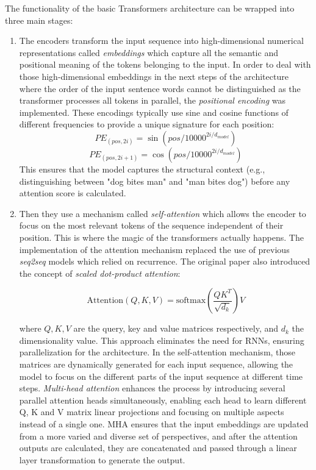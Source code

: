 
The functionality of the basic Transformers architecture can be wrapped into three main stages: 

\begin{enumerate}
	\item The encoders transform the input sequence into high-dimensional numerical representations called \textit{embeddings} which capture all the semantic and positional meaning of the tokens belonging to the input. In order to deal with those high-dimensional embeddings in the next steps of the architecture where the order of the input sentence words cannot be distinguished as the transformer processes all tokens in parallel, the \textit{positional encoding} was implemented. These encodings typically use sine and cosine functions of different frequencies to provide a unique signature for each position:
	\[
	PE_{(pos, 2i)} = \sin(pos / 10000^{2i/d_{model}})
	\]
	\[
	PE_{(pos, 2i+1)} = \cos(pos / 10000^{2i/d_{model}})
	\]
	This ensures that the model captures the structural context (e.g., distinguishing between "dog bites man" and "man bites dog") before any attention score is calculated.
	
	\item Then they use a mechanism called \textit{self-attention} which allows the encoder to focus on the most relevant tokens of the sequence independent of their position. This is where the magic of the transformers actually happens. The implementation of the attention mechanism replaced the use of previous \textit{seq2seq} models which relied on recurrence. The original paper also introduced the concept of \textit{scaled dot-product attention}: 
	
	$$\text{Attention}(Q, K, V) = \text{softmax}\left(\frac{QK^T}{\sqrt{d_k}}\right)V$$
	
	where $Q, K, V$ are the query, key and value matrices respectively, and $d_{k}$ the dimensionality value. This approach eliminates the need for RNNs, ensuring parallelization for the architecture. In the self-attention mechanism, those matrices are dynamically generated for each input sequence, allowing the model to focus on the different parts of the input sequence at different time steps. \textit{Multi-head attention} enhances the process by introducing several parallel attention heads simultaneously, enabling each head to learn different Q, K and V matrix linear projections and focusing on multiple aspects instead of a single one. MHA ensures that the input embeddings are updated from a more varied and diverse set of perspectives, and after the attention outputs are calculated, they are concatenated and passed through a linear layer transformation to generate the output. 
	

\end{enumerate}

